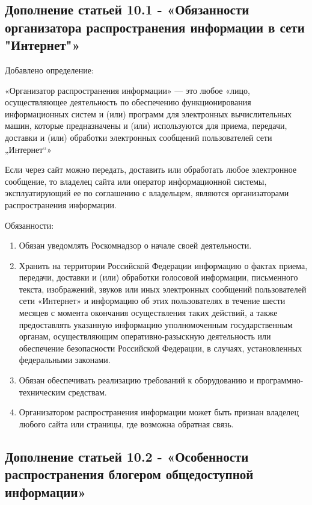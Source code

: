 \documentclass[14pt,a4paper,report]{article}
\begin{document}
\subsection{Дополнение статьей 10.1 - «Обязанности организатора распространения информации в сети "Интернет"»}


Добавлено определение:
\begin{displayquote}
	 «Организатор распространения информации» — это любое «лицо, осуществляющее деятельность по обеспечению функционирования информационных систем и (или) программ для электронных вычислительных машин, которые предназначены и (или) используются для приема, передачи, доставки и (или) обработки электронных сообщений пользователей сети „Интернет“»
\end{displayquote}

Если через сайт можно передать, доставить или обработать любое электронное сообщение, то владелец сайта или оператор информационной системы, эксплуатирующий ее по соглашению с владельцем, являются организаторами распространения информации. 

Обязанности:
\begin{enumerate}
    \item Обязан уведомлять Роскомнадзор о начале своей деятельности.
    
	\item Хранить на территории Российской Федерации информацию о фактах приема, передачи, доставки и (или) обработки голосовой информации, письменного текста, изображений, звуков или иных электронных сообщений пользователей сети «Интернет» и информацию об этих пользователях в течение шести месяцев с момента окончания осуществления таких действий, а также предоставлять указанную информацию уполномоченным государственным органам, осуществляющим оперативно-разыскную деятельность или обеспечение безопасности Российской Федерации, в случаях, установленных федеральными законами.
	
	\item Обязан обеспечивать реализацию требований к оборудованию и программно-техническим средствам.
	
	\item Организатором распространения информации может быть признан владелец любого сайта или страницы, где возможна обратная связь.
	
\end{enumerate}

\subsection{Дополнение статьей 10.2 - «Особенности распространения блогером общедоступной информации»}
\end{document}
